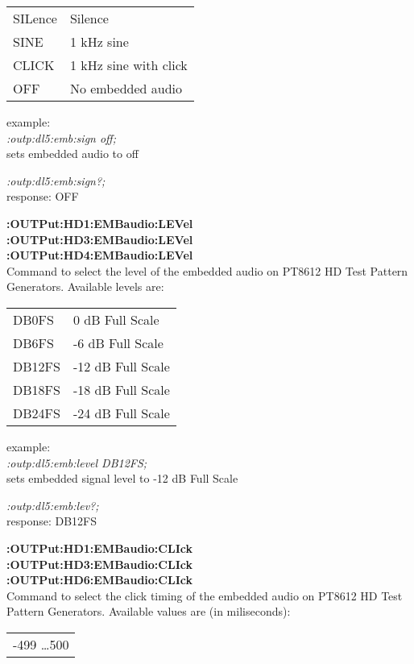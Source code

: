 \begin{tabular}{l l}
SILence  &   Silence				\\
SINE     &   1 kHz sine				\\
CLICK    &   1 kHz sine with click	\\
OFF      &   No embedded audio\\
\end{tabular}

example:\\
\textit{:outp:dl5:emb:sign off;}\\
sets embedded audio to off

\textit{:outp:dl5:emb:sign?;}\\
response: OFF

\textbf{:OUTPut:HD1:EMBaudio:LEVel}\\
\textbf{:OUTPut:HD3:EMBaudio:LEVel}\\
\textbf{:OUTPut:HD4:EMBaudio:LEVel}\\
Command to select the level of the embedded audio on PT8612 HD Test Pattern Generators.  Available levels are:

\begin{tabular}{l l}
DB0FS  &    0 dB Full Scale\\
DB6FS  &   -6 dB Full Scale\\
DB12FS &  -12 dB Full Scale \\
DB18FS &  -18 dB Full Scale \\
DB24FS &  -24 dB Full Scale \\
\end{tabular}

example:\\
\textit{:outp:dl5:emb:level DB12FS;}\\
sets embedded signal level to -12 dB Full Scale

\textit{:outp:dl5:emb:lev?;}\\
response: DB12FS

\textbf{:OUTPut:HD1:EMBaudio:CLIck}\\
\textbf{:OUTPut:HD3:EMBaudio:CLIck}\\
\textbf{:OUTPut:HD6:EMBaudio:CLIck}\\
Command to select the click timing of the embedded audio on PT8612 HD Test Pattern Generators.  Available values are (in miliseconds):

\begin{tabular}{l}
    -499 \ldots 500 \\
\end{tabular}


